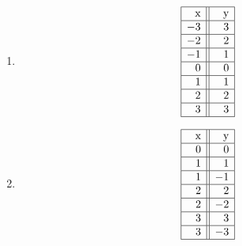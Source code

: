 \begin{multicols}{2}

\begin{enumerate}

\setcounter{enumi}{\value{HW}}

\item  \label{tablefirst} 

\[\begin{array}{|r||r|}  \hline

$x$  & \hphantom{\text{$-$}} $y$  \\ \hline
 -3 &  3 \\  \hline
 -2 & 2  \\  \hline
  -1 &  1  \\  \hline
 0 &  0 \\  \hline
 1 & 1  \\  \hline
 2 &  2 \\  \hline
 3 & 3  \\  \hline

\end{array}\]

\item \label{tablelast}

\[\begin{array}{|r||r|}  \hline

\hphantom{\text{$-$}} $x$  &$y$  \\ \hline

 0 & 0 \\  \hline
 1 & 1  \\  \hline
 1 & -1  \\  \hline
 2 &  2 \\  \hline
 2 & -2  \\  \hline
 3 &  3 \\  \hline
 3 & -3  \\  \hline

\end{array}\]

\setcounter{HW}{\value{enumi}}

\end{enumerate}

\end{multicols}

